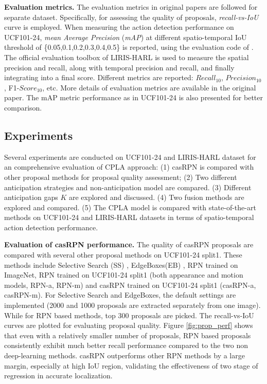 \documentclass{bmvc2k}
\begin{document}
\textbf{Evaluation metrics.}
The evaluation metrics in original papers \cite{soomro2012ucf101,wolf2014evaluation} are followed for separate dataset. Specifically, for assessing the quality of proposals, \textit{recall-vs-IoU} curve is employed. When measuring the action detection performance on UCF101-24, \textit{mean Average Precision} (\textit{mAP}) at different spatio-temporal IoU threshold of \{0.05,0.1,0.2,0.3,0.4,0.5\} is reported, using the evaluation code of \cite{suman16bmvc}. The official evaluation toolbox of LIRIS-HARL is used to measure the spatial precision and recall, along with temporal precision and recall, and finally integrating into a final score. Different metrics are reported: $Recall_{10}$, $Precision_{10}$, F1-$Score_{10}$, etc. More details of evaluation metrics are available in the original paper. The mAP metric performance as in UCF101-24 is also presented for better comparison. 

\subsection{Experiments}

Several experiments are conducted on UCF101-24 and LIRIS-HARL dataset for an comprehensive evaluation of CPLA approach: (1) casRPN is compared with other proposal methods for proposal quality assessment; (2) Two different anticipation strategies and non-anticipation model are compared. (3) Different anticipation gaps $K$ are explored and discussed. (4) Two fusion methods are explored and compared. (5) The CPLA model is compared with state-of-the-art methods on UCF101-24 and LIRIS-HARL datasets in terms of spatio-temporal action detection performance.

\textbf{Evaluation of casRPN performance.} The quality of casRPN proposals are compared with several other proposal methods on UCF101-24 split1. These methods include Selective Search (SS) \cite{uijlings2013selective}, EdgeBoxes(EB) \cite{zitnick2014edge}, RPN trained on ImageNet, RPN trained on UCF101-24 split1 (both appearance and motion models, RPN-a, RPN-m) and casRPN trained on UCF101-24 split1 (casRPN-a, casRPN-m). For Selective Search and EdgeBoxes, the default settings are implemented (2000 and 1000 proposals are extracted separately from one image). While for RPN based methods, top 300 proposals are picked. The recall-vs-IoU curves are plotted for evaluating proposal quality. Figure \ref{fig:prop_perf} shows that even with a relatively smaller number of proposals, RPN based proposals consistently exhibit much better recall performance compared to the two non deep-learning methods. casRPN outperforms other RPN methods by a large margin, especially at high IoU region, validating the effectiveness of two stage of regression in accurate localization. 
\end{document}
